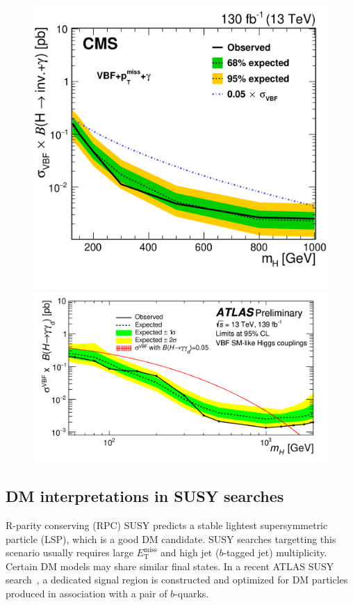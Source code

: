 \documentclass{moriond}
\def\et{E_\textrm{T}^{\textrm{miss}}}
\begin{document}
\begin{figure} [htb]
\begin{minipage}{0.45\linewidth}
\centerline{\includegraphics[width=0.9\linewidth]{cmsvbf}}
\end{minipage}
\begin{minipage}{0.45\linewidth}
\centerline{\includegraphics[width=0.9\linewidth]{atlasvbf}}
\end{minipage}
\caption[]{}
\label{fig:vbf}
\end{figure}

\subsection{DM interpretations in SUSY searches}

R-parity conserving (RPC) SUSY predicts a stable lightest supersymmetric
particle (LSP), which is a good DM candidate. SUSY searches targetting this
scenario usually requires large $\et$ and high jet ($b$-tagged jet)
multiplicity. Certain DM models may share similar final states. In a recent
ATLAS SUSY search~\cite{dmbb}, a dedicated signal region is constructed and
optimized for DM particles produced in association with a pair of $b$-quarks.      
\end{document}
